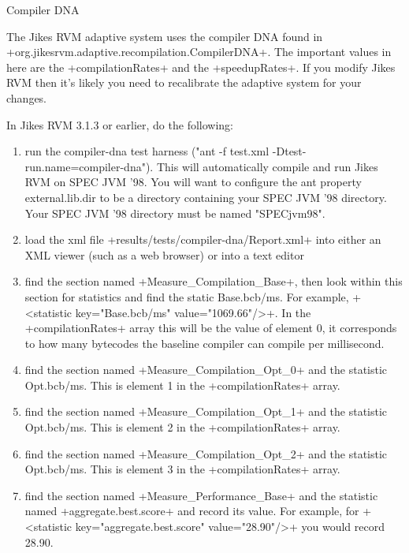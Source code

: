 \begin{section}{Compiler DNA}
\label{sec:compilerdna}

The Jikes RVM adaptive system uses the compiler DNA found in \newline \spverb+org.jikesrvm.adaptive.recompilation.CompilerDNA+. The important values in here are the \spverb+compilationRates+ and the \spverb+speedupRates+. If you modify Jikes RVM then it's likely you need to recalibrate the adaptive system for your changes.

In Jikes RVM 3.1.3 or earlier, do the following:

\begin{enumerate}
    \item run the compiler-dna test harness ("ant -f test.xml -Dtest-run.name=compiler-dna"). This will automatically compile and run Jikes RVM on SPEC JVM '98. You will want to configure the ant property external.lib.dir to be a directory containing your SPEC JVM '98 directory. Your SPEC JVM '98 directory must be named "SPECjvm98".
    \item load the xml file \spverb+results/tests/compiler-dna/Report.xml+ into either an XML viewer (such as a web browser) or into a text editor
    \item find the section named \spverb+Measure_Compilation_Base+, then look within this section for statistics and find the static Base.bcb/ms. For example, \spverb+<statistic key="Base.bcb/ms" value="1069.66"/>+. In the \newline \spverb+compilationRates+ array this will be the value of element 0, it corresponds to how many bytecodes the baseline compiler can compile per millisecond.
    \item find the section named \spverb+Measure_Compilation_Opt_0+ and the statistic Opt.bcb/ms. This is element 1 in the \spverb+compilationRates+ array.
    \item find the section named \spverb+Measure_Compilation_Opt_1+ and the statistic Opt.bcb/ms. This is element 2 in the \spverb+compilationRates+ array.
    \item find the section named \spverb+Measure_Compilation_Opt_2+ and the statistic Opt.bcb/ms. This is element 3 in the \spverb+compilationRates+ array.
    \item find the section named \spverb+Measure_Performance_Base+ and the statistic named \spverb+aggregate.best.score+ and record its value. For example, for \spverb+<statistic key="aggregate.best.score" value="28.90"/>+ you would record 28.90.

\end{enumerate}
\end{section}
